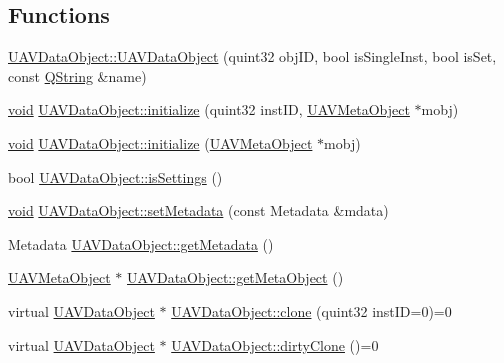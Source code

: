 \subsection*{\-Functions}
\begin{DoxyCompactItemize}
\item 
\hyperlink{group___u_a_v_objects_plugin_ga98ff6f0f25a431f4efce59fcbe9176e5}{\-U\-A\-V\-Data\-Object\-::\-U\-A\-V\-Data\-Object} (quint32 obj\-I\-D, bool is\-Single\-Inst, bool is\-Set, const \hyperlink{group___u_a_v_objects_plugin_gab9d252f49c333c94a72f97ce3105a32d}{\-Q\-String} \&name)
\item 
\hyperlink{group___u_a_v_objects_plugin_ga444cf2ff3f0ecbe028adce838d373f5c}{void} \hyperlink{group___u_a_v_objects_plugin_ga9f3e150d973455c643bc5f582433cd51}{\-U\-A\-V\-Data\-Object\-::initialize} (quint32 inst\-I\-D, \hyperlink{class_u_a_v_meta_object}{\-U\-A\-V\-Meta\-Object} $\ast$mobj)
\item 
\hyperlink{group___u_a_v_objects_plugin_ga444cf2ff3f0ecbe028adce838d373f5c}{void} \hyperlink{group___u_a_v_objects_plugin_ga15063ab51e35069afd31709cc2f43276}{\-U\-A\-V\-Data\-Object\-::initialize} (\hyperlink{class_u_a_v_meta_object}{\-U\-A\-V\-Meta\-Object} $\ast$mobj)
\item 
bool \hyperlink{group___u_a_v_objects_plugin_ga77932d3af8bd55182bbc39af1f01f447}{\-U\-A\-V\-Data\-Object\-::is\-Settings} ()
\item 
\hyperlink{group___u_a_v_objects_plugin_ga444cf2ff3f0ecbe028adce838d373f5c}{void} \hyperlink{group___u_a_v_objects_plugin_ga968c4e54cd5088bed83546338e44de6b}{\-U\-A\-V\-Data\-Object\-::set\-Metadata} (const \-Metadata \&mdata)
\item 
\-Metadata \hyperlink{group___u_a_v_objects_plugin_ga8c0434ba77ed0cfbcc2306bdc6b0248c}{\-U\-A\-V\-Data\-Object\-::get\-Metadata} ()
\item 
\hyperlink{class_u_a_v_meta_object}{\-U\-A\-V\-Meta\-Object} $\ast$ \hyperlink{group___u_a_v_objects_plugin_gae14c5b7e20f137db436d3c1e7d1949ec}{\-U\-A\-V\-Data\-Object\-::get\-Meta\-Object} ()
\item 
virtual \hyperlink{class_u_a_v_data_object}{\-U\-A\-V\-Data\-Object} $\ast$ \hyperlink{group___u_a_v_objects_plugin_ga9c113847ecf6bd99cf7efe3535620e66}{\-U\-A\-V\-Data\-Object\-::clone} (quint32 inst\-I\-D=0)=0
\item 
virtual \hyperlink{class_u_a_v_data_object}{\-U\-A\-V\-Data\-Object} $\ast$ \hyperlink{group___u_a_v_objects_plugin_gae075ec1715d23e8bff81e913bc1dd303}{\-U\-A\-V\-Data\-Object\-::dirty\-Clone} ()=0

\end{DoxyCompactItemize}
